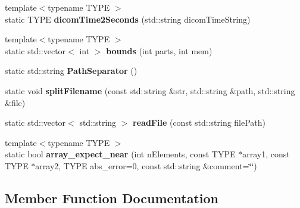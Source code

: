 \begin{DoxyCompactItemize}
\item 
{\footnotesize template$<$typename T\+Y\+PE $>$ }\\static T\+Y\+PE {\bfseries dicom\+Time2\+Seconds} (std\+::string dicom\+Time\+String)\hypertarget{class_k_w_util_a21813a6377e55fa15c70f64afb2feb51}{}\label{class_k_w_util_a21813a6377e55fa15c70f64afb2feb51}

\item 
{\footnotesize template$<$typename T\+Y\+PE $>$ }\\static std\+::vector$<$ int $>$ {\bfseries bounds} (int parts, int mem)\hypertarget{class_k_w_util_a498350d10204849240a945ea682ecc98}{}\label{class_k_w_util_a498350d10204849240a945ea682ecc98}

\item 
static std\+::string {\bfseries Path\+Separator} ()\hypertarget{class_k_w_util_a19d7a4b4320a3b9d8ff06e4d296e2893}{}\label{class_k_w_util_a19d7a4b4320a3b9d8ff06e4d296e2893}

\item 
static void {\bfseries split\+Filename} (const std\+::string \&str, std\+::string \&path, std\+::string \&file)\hypertarget{class_k_w_util_afe6ad66b5fe06a8b42918634076ab056}{}\label{class_k_w_util_afe6ad66b5fe06a8b42918634076ab056}

\item 
static std\+::vector$<$ std\+::string $>$ {\bfseries read\+File} (const std\+::string file\+Path)\hypertarget{class_k_w_util_a70a639cebc8982645a9ba44f73b93d85}{}\label{class_k_w_util_a70a639cebc8982645a9ba44f73b93d85}

\item 
{\footnotesize template$<$typename T\+Y\+PE $>$ }\\static bool {\bfseries array\+\_\+expect\+\_\+near} (int n\+Elements, const T\+Y\+PE $\ast$array1, const T\+Y\+PE $\ast$array2, T\+Y\+PE abs\+\_\+error=0, const std\+::string \&comment=\char`\"{}\char`\"{})\hypertarget{class_k_w_util_ab1c8383b5dd09f36872922209da43131}{}\label{class_k_w_util_ab1c8383b5dd09f36872922209da43131}

\end{DoxyCompactItemize}


\subsection{Member Function Documentation}
